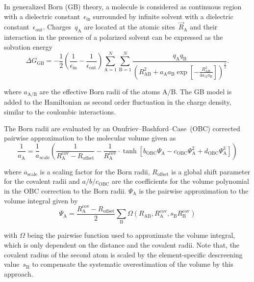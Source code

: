 In generalized Born (GB) theory,\cite{onufriev2019} a molecule is considered as
continuous region with a dielectric constant~$\epsilon_\text{in}$ surrounded by
infinite solvent with a dielectric constant~$\epsilon_\text{out}$.
Charges~$q_\text{A}$ are located at the atomic sites~$\vec R_\text{A}$
and their interaction in the presence of a polarized solvent can be
expressed as the solvation energy
%
\begin{equation}
  \Delta G_\text{GB} =
  -\frac12 \left(\frac1{\epsilon_\text{in}}-\frac1{\epsilon_\text{out}}\right)
  \sum_{\text{A}=1}^N\sum_{\text{B}=1}^N\frac{q_\text{A}q_\text{B}}
  {\left(R^2_\text{AB} + a_\text{A}a_\text{B}\exp\left[-\frac{R^2_\text{AB}}
  {4a_\text{A}a_\text{B}}\right]\right)^{\frac12}}.
\end{equation}

where $a_\text{A/B}$ are the effective Born radii of the atoms A/B.
The GB model is added to the Hamiltonian as second order fluctuation
in the charge density, similar to the coulombic interactions.

The Born radii are evaluated by an Onufriev--Bashford--Case~(OBC) corrected
pairwise approximation to the molecular volume given as
%
\begin{equation}
  \frac1{a_\text{A}} = \frac1a_\text{scale}\left(
  \frac1{R^\text{cov}_\text{A} - R_\text{offset}}
  - \frac1{R^\text{cov}_\text{A}}
  \cdot \tanh\left[b_\text{OBC}\Psi_\text{A}
  - c_\text{OBC}\Psi_\text{A}^2 + d_\text{OBC}\Psi_\text{A}^3\right]
  \right)
\end{equation}

where $a_\text{scale}$ is a scaling factor for the Born radii,
$R_\text{offset}$ is a global shift parameter for the covalent radii and
$a/b/c_\text{OBC}$ are the coefficients for the volume polynomial in
the OBC correction to the Born radii.
$\Psi_\text{A}$ is the pairwise approximation to the volume integral
given by
%
\begin{equation}
  \Psi_\text{A} = \frac{R^\text{cov}_\text{A} - R_\text{offset}}2
  \sum_\text{B} \Omega(R_\text{AB}, R^\text{cov}_\text{A}, s_\text{B}R^\text{cov}_\text{B})
\end{equation}

with $\Omega$ being the pairwise function used to approximate the
volume integral, which is only dependent on the distance and the
covalent radii. Note that, the covalent radius of the second atom
is scaled by the element-specific descreening value~$s_\text{B}$
to compensate the systematic overestimation of the volume by this
approach.

